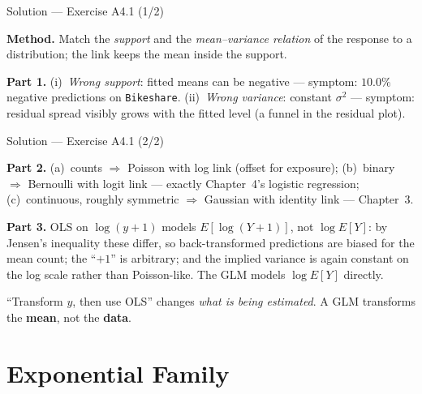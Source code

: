 \documentclass[aspectratio=169,11pt]{beamer}
\begin{document}
\begin{frame}{Solution --- Exercise A4.1 (1/2)}
\begin{solutionbox}
  \textbf{Method.} Match the \emph{support} and the \emph{mean--variance relation} of the
  response to a distribution; the link keeps the mean inside the support.

  \textbf{Part 1.} (i)~\emph{Wrong support}: fitted means can be negative ---
  symptom: $10.0\%$ negative predictions on \texttt{Bikeshare}. (ii)~\emph{Wrong
  variance}: constant $\sigma^2$ --- symptom: residual spread visibly grows with the
  fitted level (a funnel in the residual plot).
\end{solutionbox}
\end{frame}

\begin{frame}{Solution --- Exercise A4.1 (2/2)}
\begin{solutionbox}
  \textbf{Part 2.} (a)~counts $\Rightarrow$ Poisson with log link (offset for exposure);
  (b)~binary $\Rightarrow$ Bernoulli with logit link --- exactly Chapter~4's logistic
  regression; (c)~continuous, roughly symmetric $\Rightarrow$ Gaussian with identity
  link --- Chapter~3.

  \textbf{Part 3.} OLS on $\log(y+1)$ models $E[\log(Y+1)]$, not $\log E[Y]$: by
  Jensen's inequality these differ, so back-transformed predictions are biased for the
  mean count; the ``$+1$'' is arbitrary; and the implied variance is again constant on
  the log scale rather than Poisson-like. The GLM models $\log E[Y]$ directly.
\end{solutionbox}
\begin{mistake}
  ``Transform $y$, then use OLS'' changes \emph{what is being estimated}. A GLM
  transforms the \textbf{mean}, not the \textbf{data}.
\end{mistake}
\end{frame}

\section{Exponential Family}
\end{document}
